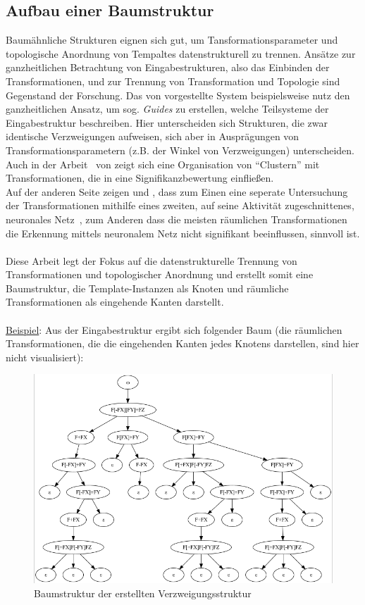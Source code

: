 \subsection*{Aufbau einer Baumstruktur}
Baumähnliche Strukturen eignen sich gut, um Tansformationsparameter und topologische Anordnung von Tempaltes
datenstrukturell zu trennen.
Ansätze zur ganzheitlichen Betrachtung von Eingabestrukturen, also das Einbinden der Transformationen,
und zur Trennung von Transformation und Topologie sind Gegenstand der Forschung.
Das von \citeauthor{benes_2011} vorgestellte System beispielsweise nutz den ganzheitlichen Ansatz, um sog.
\textit{Guides} zu erstellen, welche Teilsysteme der Eingabestruktur beschreiben.
Hier unterscheiden sich Strukturen, die zwar identische Verzweigungen aufweisen, sich aber in Ausprägungen
von Transformationsparametern (z.B. der Winkel von Verzweigungen) unterscheiden.
Auch in der Arbeit~\cite{stava_2010} von \citeauthor{stava_2010} zeigt sich eine Organisation von
"`Clustern"' mit Transformationen, die in eine Signifikanzbewertung einfließen.\\
Auf der anderen Seite zeigen \citeauthor{nishida_2016} und \citeauthor{guo_2020},
dass zum Einen eine seperate Untersuchung der Transformationen mithilfe eines zweiten,
auf seine Aktivität zugeschnittenes, neuronales Netz~\cite{nishida_2016}, zum Anderen dass die meisten
räumlichen Transformationen die Erkennung mittels neuronalem Netz nicht signifikant beeinflussen,
sinnvoll ist.\\~\\
Diese Arbeit legt der Fokus auf die datenstrukturelle Trennung von Transformationen und topologischer
Anordnung und erstellt somit eine Baumstruktur, die Template-Instanzen als Knoten und
räumliche Transformationen als eingehende Kanten darstellt.\\~\\
\underline{Beispiel}: Aus der Eingabestruktur ergibt sich folgender Baum (die räumlichen Transformationen,
die die eingehenden Kanten jedes Knotens darstellen, sind hier nicht visualisiert):
\begin{figure}[H]
    \centering
    \includegraphics[width=14cm]{../images/evaluierung_inferrieren_baum.png}
    \caption{Baumstruktur der erstellten Verzweigungsstruktur}
\end{figure}

